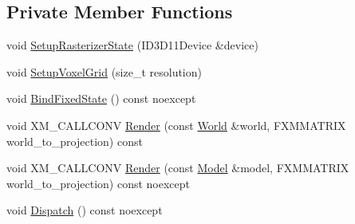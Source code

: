 \subsection*{Private Member Functions}
\begin{DoxyCompactItemize}
\item 
void \mbox{\hyperlink{classmage_1_1rendering_1_1_voxelization_pass_a7f8af2ecd3eb69f4f052be7b9ce67650}{Setup\+Rasterizer\+State}} (I\+D3\+D11\+Device \&device)
\item 
void \mbox{\hyperlink{classmage_1_1rendering_1_1_voxelization_pass_a09f3b3c1a08b28c3815fb4fa1f0611f5}{Setup\+Voxel\+Grid}} (size\+\_\+t resolution)
\item 
void \mbox{\hyperlink{classmage_1_1rendering_1_1_voxelization_pass_ae69d6465ab918f12940339436fe56c56}{Bind\+Fixed\+State}} () const noexcept
\item 
void X\+M\+\_\+\+C\+A\+L\+L\+C\+O\+NV \mbox{\hyperlink{classmage_1_1rendering_1_1_voxelization_pass_a1f29b02c3e4557518c78dad993d3e482}{Render}} (const \mbox{\hyperlink{classmage_1_1rendering_1_1_world}{World}} \&world, F\+X\+M\+M\+A\+T\+R\+IX world\+\_\+to\+\_\+projection) const
\item 
void X\+M\+\_\+\+C\+A\+L\+L\+C\+O\+NV \mbox{\hyperlink{classmage_1_1rendering_1_1_voxelization_pass_aa993ec5ff093f3948f13bf3187a11e6c}{Render}} (const \mbox{\hyperlink{classmage_1_1rendering_1_1_model}{Model}} \&model, F\+X\+M\+M\+A\+T\+R\+IX world\+\_\+to\+\_\+projection) const noexcept
\item 
void \mbox{\hyperlink{classmage_1_1rendering_1_1_voxelization_pass_a5026abcbe3aad3627e96ee055df8b842}{Dispatch}} () const noexcept
\end{DoxyCompactItemize}
